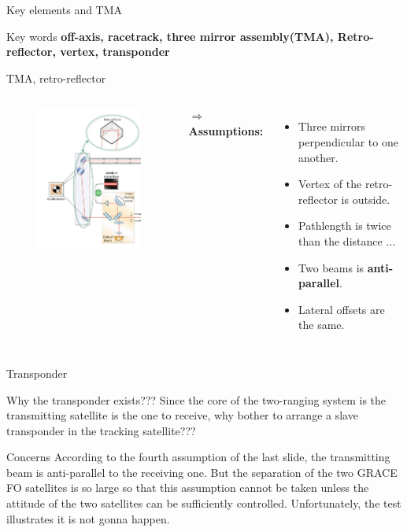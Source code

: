 \documentclass[12pt,english,ignorenonframetext,]{beamer}
\begin{document}
\begin{frame}{Key elements and TMA}
	\begin{block}{Key words}
		\textbf{off-axis, racetrack, three mirror assembly(TMA), Retro-reflector, vertex, transponder}
	\end{block}
	
	\begin{block}{TMA, retro-reflector}
		\begin{columns}
			\column{4cm}
			\begin{figure}
				\includegraphics[height=0.5\textheight]{..//images//retroreflector.png}
			\end{figure}
			\column{8.5cm}
			$\Longrightarrow$ \textbf{Assumptions:}
			\begin{itemize}
				\item Three mirrors perpendicular to one another.
				\item Vertex of the retro-reflector is outside.
				\item Pathlength is twice than the distance $\dots$
				\item Two beams is \textbf{anti-parallel}.
				\item Lateral offsets are the same.
			\end{itemize}
		\end{columns}
	\end{block}
\end{frame}

\begin{frame}{Transponder}
	\begin{block}{Why the transponder exists???}
		Since the core of the two-ranging system is the transmitting satellite is the one to receive, why bother to arrange a slave transponder in the tracking satellite???
	\end{block}

	\begin{block}{Concerns}
		According to the fourth assumption of the last slide, the transmitting beam is anti-parallel to the receiving one. But the separation of the two GRACE FO satellites is so large so that this assumption cannot be taken unless the attitude of the two satellites can be sufficiently controlled. Unfortunately, the test illustrates it is not gonna happen.
	\end{block}
\end{frame}
\end{document}
